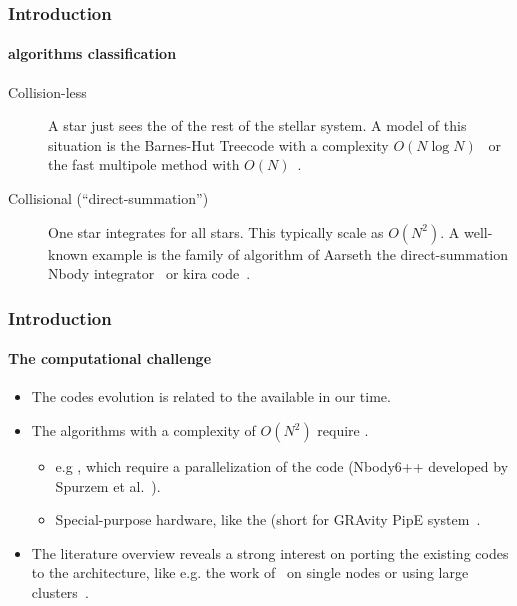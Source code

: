 \begin{frame}
    \frametitle{Introduction}
    \framesubtitle{{\nbody} algorithms classification}

    \begin{description}
        \item[Collision-less]
            A star just sees the  of the rest of
            the stellar system.
            A model of this situation is the Barnes-Hut Treecode
            with a complexity $O(N\log N)$~\cite{BarnesHut86}
            or the fast multipole method with $O(N)$~\cite{GreendardThesis}.
            \vspace{0.7cm}
        \item[Collisional (``direct-summation'')]
            One star integrates 
            for all stars. This typically scale as $O(N^{2})$.
            A well-known example is the family of algorithm of Aarseth
            the direct-summation {\sc Nbody} integrator~\cite{Aarseth99,Spurzem1999,Aarseth03}
            or {\sc kira} code~\cite{PortegiesZwartEtAl01}.
    \end{description}

\end{frame}


\begin{frame}
    \frametitle{Introduction}
    \framesubtitle{The computational challenge}

    \begin{itemize}
        \item The {\nbody} codes evolution is related to the available
                 in our time.
        \item The algorithms with a complexity of $O(N^{2})$ require
                .
        \begin{itemize}
            \item  e.g ,
                which require a parallelization of the code
                ({\sc Nbody6++} developed by Spurzem et al.~\cite{Spurzem1999}).

            \item Special-purpose hardware, like the  (short for GRAvity
                PipE system~\cite{TMFES96,MT98,Makino98,GRAPE6A}.

        \end{itemize}

        \item  The literature overview reveals a strong interest on porting the existing codes to the
             architecture, like e.g. the work
            of~\cite{Portegies2007a,Hamada2007,Belleman2008}
            on single nodes or using large
            clusters~\cite{berczik2011high,NitadoriAarseth2012,Capuzzo-DolcettaEtAl2013}.

    \end{itemize}

\end{frame}
